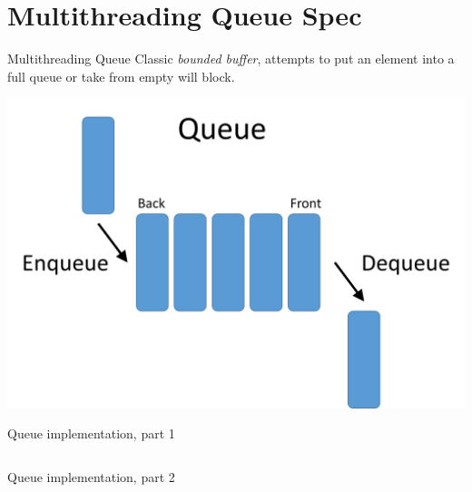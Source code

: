\documentclass[12pt]{beamer}
\begin{document}
  \section{Multithreading Queue Spec}
  \begin{frame}{Multithreading Queue}
      Classic \textit{bounded buffer}, attempts to put an element into a
      full queue or take from empty will block.
      \begin{center}
          \includegraphics[scale=0.30]{figures/queue}
      \end{center}
  \end{frame}
  \begin{frame}{Queue implementation, part 1}
      \begin{center}
          \inputminted[firstline=1,lastline=20,linenos,
            fontsize=\scriptsize]{python}{figures/queue.py}
      \end{center}
  \end{frame}
  \begin{frame}{Queue implementation, part 2}
      \begin{center}
          \inputminted[firstline=22,lastline=40,linenos,
            fontsize=\scriptsize]{python}{figures/queue.py}
      \end{center}
  \end{frame}
\end{document}
